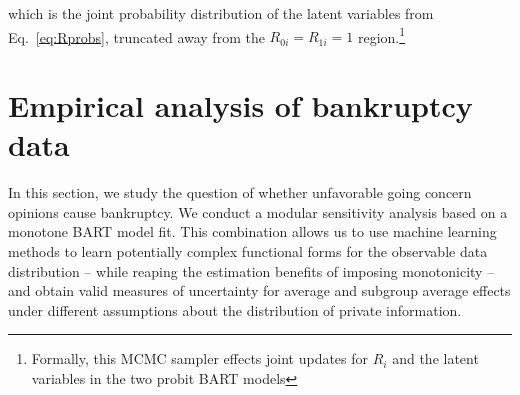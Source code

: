 \documentclass[aoas,preprint, 11pt, dvipsnames, table, x11name]{imsart}
\theoremstyle{remark}
\begin{document}
	which is the joint probability distribution of the latent variables from Eq.~\eqref{eq:Rprobs}, truncated away from the $R_{0i} = R_{1i}=1$  region.\footnote{Formally, this MCMC sampler effects joint updates for $R_i$ and the latent variables in the two probit BART models}
	
	
	\section{Empirical analysis of bankruptcy data}\label{empirical_section}
	
	In this section, we study the question of whether unfavorable going concern opinions cause bankruptcy. We conduct a modular sensitivity analysis based on a monotone BART model fit. This combination allows us to use machine learning methods to learn potentially complex functional forms for the observable data distribution -- while reaping the estimation benefits of imposing monotonicity -- and obtain valid measures of uncertainty for average and subgroup average effects under different assumptions about the distribution of private information.
	
\end{document}
